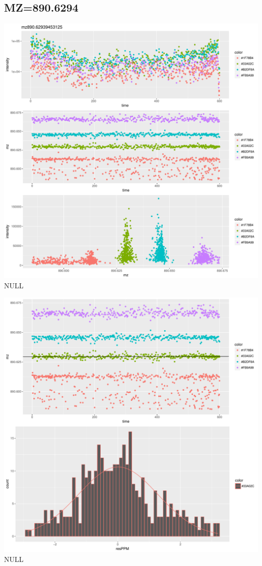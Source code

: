 \documentclass[]{article}
\begin{document}
\subsection{MZ=890.6294}\label{mz890.6294}

\includegraphics{Supplementary_document_files/figure-latex/cluster.mz.890-1.pdf}
NULL

\includegraphics{Supplementary_document_files/figure-latex/filter.lm.890-1.pdf}
NULL
\end{document}
